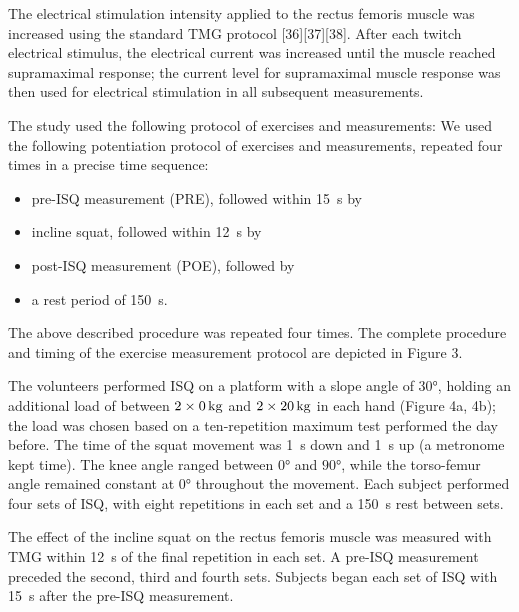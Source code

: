 \documentclass[utf8]{style/FrontiersinHarvard}
\begin{document}
The electrical stimulation intensity applied to the rectus femoris muscle was increased using the standard TMG protocol [36][37][38].
After each twitch electrical stimulus, the electrical current was increased until the muscle reached supramaximal response;
the current level for supramaximal muscle response was then used for electrical stimulation in all subsequent measurements.

The study used the following protocol of exercises and measurements:
We used the following potentiation protocol of exercises and measurements, repeated four times in a precise time sequence:
\begin{itemize}

    \item pre-ISQ measurement (PRE), followed within \SI{15}{\second} by

    \item incline squat, followed within \SI{12}{\second} by

    \item post-ISQ measurement (POE), followed by

    \item a rest period of \SI{150}{\second}.

\end{itemize}
The above described procedure was repeated four times.
The complete procedure and timing of the exercise measurement protocol are depicted in Figure 3.

The volunteers performed ISQ on a platform with a slope angle of $ \ang{30} $, holding an additional load of between $ \SI[parse-numbers = false]{2 \times 0}{\kilogram} $ and $ \SI[parse-numbers = false]{2 \times 20}{\kilogram} $ in each hand (Figure 4a, 4b);
the load was chosen based on a ten-repetition maximum test performed the day before.
The time of the squat movement was \SI{1}{\second} down and \SI{1}{\second} up (a metronome kept time).
The knee angle ranged between $ \ang{0} $ and $ \ang{90} $, while the torso-femur angle remained constant at $ \ang{0} $ throughout the movement.
Each subject performed four sets of ISQ, with eight repetitions in each set and a \SI{150}{\second} rest between sets.

The effect of the incline squat on the rectus femoris muscle was measured with TMG within \SI{12}{\second} of the final repetition in each set.
A pre-ISQ measurement preceded the second, third and fourth sets.
Subjects began each set of ISQ with \SI{15}{\second} after the pre-ISQ measurement.
\end{document}
